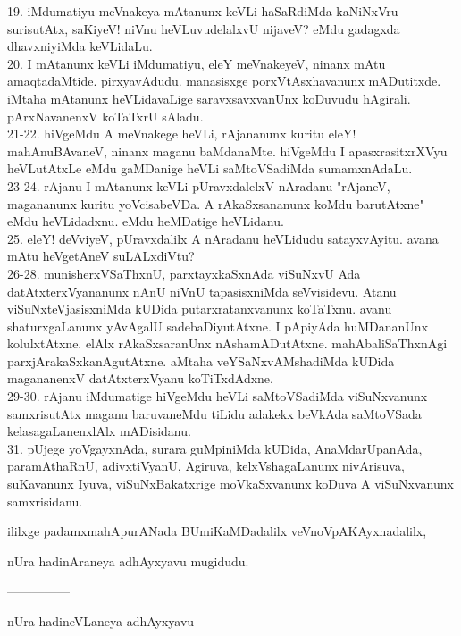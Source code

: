 \documentclass{article}
\begin{document}
19. iMdumatiyu meVnakeya mAtanunx keVLi haSaRdiMda kaNiNxVru surisutAtx, saKiyeV! niVnu heVLuvudelalxvU nijaveV? eMdu gadagxda dhavxniyiMda keVLidaLu.\\
20. I mAtanunx keVLi iMdumatiyu, eleY meVnakeyeV, ninanx mAtu amaqtadaMtide. pirxyavAdudu. manasisxge porxVtAsxhavanunx mADutitxde. iMtaha mAtanunx heVLidavaLige saravxsavxvanUnx koDuvudu hAgirali. pArxNavanenxV koTaTxrU sAladu.\\
21-22. hiVgeMdu A meVnakege heVLi, rAjananunx kuritu eleY! mahAnuBAvaneV, ninanx maganu baMdanaMte. hiVgeMdu I apasxrasitxrXVyu heVLutAtxLe eMdu gaMDanige heVLi saMtoVSadiMda sumamxnAdaLu.\\
23-24. rAjanu I mAtanunx keVLi pUravxdalelxV nAradanu "rAjaneV, magananunx kuritu yoVcisabeVDa. A rAkaSxsananunx koMdu barutAtxne" eMdu heVLidadxnu. eMdu heMDatige heVLidanu.\\
25. eleY! deVviyeV, pUravxdalilx A nAradanu heVLidudu satayxvAyitu. avana mAtu heVgetAneV suLALxdiVtu?\\
26-28. munisherxVSaThxnU, parxtayxkaSxnAda viSuNxvU Ada datAtxterxVyananunx nAnU niVnU tapasisxniMda seVvisidevu. Atanu viSuNxteVjasisxniMda kUDida putarxratanxvanunx koTaTxnu. avanu shaturxgaLanunx yAvAgalU sadebaDiyutAtxne. I pApiyAda huMDananUnx kolulxtAtxne. elAlx rAkaSxsaranUnx nAshamADutAtxne. mahAbaliSaThxnAgi parxjArakaSxkanAgutAtxne. aMtaha veYSaNxvAMshadiMda kUDida magananenxV datAtxterxVyanu koTiTxdAdxne.\\
29-30. rAjanu iMdumatige hiVgeMdu heVLi saMtoVSadiMda viSuNxvanunx samxrisutAtx maganu baruvaneMdu tiLidu adakekx beVkAda saMtoVSada kelasagaLanenxlAlx mADisidanu.\\
31. pUjege yoVgayxnAda, surara guMpiniMda kUDida, AnaMdarUpanAda, paramAthaRnU, adivxtiVyanU, Agiruva, kelxVshagaLanunx nivArisuva, suKavanunx Iyuva, viSuNxBakatxrige moVkaSxvanunx koDuva A viSuNxvanunx samxrisidanu.

\begin{center}
ililxge padamxmahApurANada BUmiKaMDadalilx veVnoVpAKAyxnadalilx,
\end{center}

\begin{center}
nUra hadinAraneya adhAyxyavu mugidudu.
\end{center}

\begin{center}
---------------
\end{center}

\begin{center}
nUra hadineVLaneya adhAyxyavu
\end{center}
\end{document}
